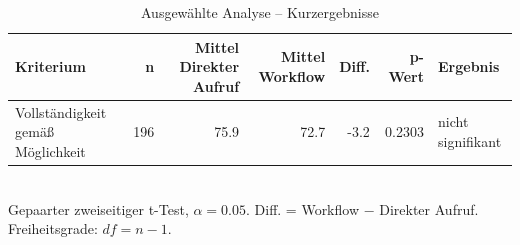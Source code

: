 \begin{table}[htbp]
\centering
\caption{Ausgewählte Analyse -- Kurzergebnisse}
\begin{tabular}{lrrrrrl}
\toprule
Kriterium & n & Mittel Direkter Aufruf & Mittel Workflow & Diff. & p-Wert & Ergebnis \\
\midrule
Vollständigkeit gemäß Möglichkeit & 196 & 75.9 & 72.7 & -3.2 & 0.2303 & nicht signifikant \\
\bottomrule
\end{tabular}
\\[2mm]
\footnotesize Gepaarter zweiseitiger t-Test, $\alpha=0.05$. Diff. = Workflow $-$ Direkter Aufruf. Freiheitsgrade: $df=n-1$.
\end{table}
